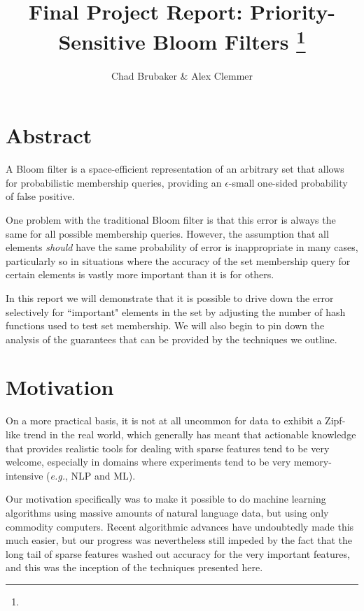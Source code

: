 \documentclass[11pt]{article}
\title{Final Project Report: Priority-Sensitive Bloom Filters
\footnote{\s{CS 6955 Data Mining; \;\; Spring 2012 \hfill
Instructor: Jeff M. Phillips, University of Utah}
}
}
\author{Chad Brubaker \& Alex Clemmer}
\begin{document}
\maketitle






\section*{Abstract}

A Bloom filter is a space-efficient representation of an arbitrary set that allows for probabilistic membership queries, providing an $\epsilon$-small one-sided probability of false positive.

One problem with the traditional Bloom filter is that this error is always the same for all possible membership queries. However, the assumption that all elements \textit{should} have the same probability of error is inappropriate in many cases, particularly so in situations where the accuracy of the set membership query for certain elements is vastly more important than it is for others.

In this report we will demonstrate that it is possible to drive down the error selectively for ``important" elements in the set by adjusting the number of hash functions used to test set membership. We will also begin to pin down the analysis of the guarantees that can be provided by the techniques we outline.

\section{Motivation}

On a more practical basis, it is not at all uncommon for data to exhibit a Zipf-like trend in the real world, which generally has meant that actionable knowledge that provides realistic tools for dealing with sparse features tend to be very welcome, especially in domains where experiments tend to be very memory-intensive (\textit{e.g.}, NLP and ML).

Our motivation specifically was to make it possible to do machine learning algorithms using massive amounts of natural language data, but using only commodity computers. Recent algorithmic advances have undoubtedly made this much easier, but our progress was nevertheless still impeded by the fact that the long tail of sparse features washed out accuracy for the very important features, and this was the inception of the techniques presented here.
\end{document}
